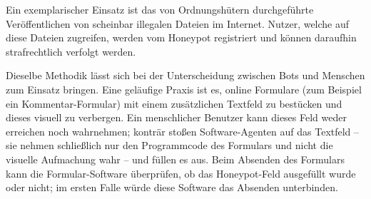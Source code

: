 Ein exemplarischer Einsatz ist das von Ordnungshütern durchgeführte Veröffentlichen von scheinbar illegalen Dateien im Internet.
Nutzer, welche auf diese Dateien zugreifen, werden vom Honeypot registriert und können daraufhin strafrechtlich verfolgt werden.

Dieselbe Methodik lässt sich bei der Unterscheidung zwischen Bots und Menschen zum Einsatz bringen.
Eine geläufige Praxis ist es, online Formulare (zum Beispiel ein Kommentar-Formular) mit einem zusätzlichen Textfeld zu bestücken und dieses visuell zu verbergen.
Ein menschlicher Benutzer kann dieses Feld weder erreichen noch wahrnehmen; konträr stoßen Software-Agenten auf das Textfeld – sie nehmen schließlich nur den Programmcode des Formulars und nicht die visuelle Aufmachung wahr – und füllen es aus.
Beim Absenden des Formulars kann die Formular-Software überprüfen, ob das Honeypot-Feld ausgefüllt wurde oder nicht; im ersten Falle würde diese Software das Absenden unterbinden.
